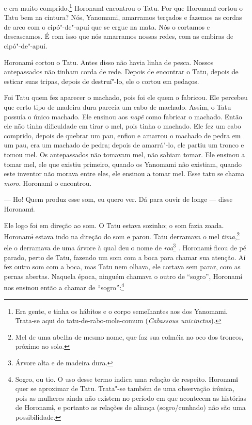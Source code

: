 
 

 

 e era muito comprido.\footnote{  Era gente, e tinha os hábitos e o corpo semelhantes aos dos Yanomami. Trata-se aqui do tatu-de-rabo-mole-comum (\emph{Cabassous unicinctus}).}  Horonamɨ
encontrou o Tatu. 
Por que Horonamɨ cortou o Tatu bem na cintura? Nós, Yanomami, amarramos
terçados e fazemos as cordas de arco com o cipó"-de"-apuí que se ergue na
mata. Nós o cortamos e descascamos. É com isso que nós amarramos nossas
redes, com as embiras de cipó"-de"-apuí. 

Horonamɨ cortou o Tatu. Antes disso não havia linha de pesca. Nossos
antepassados não tinham corda de rede. Depois de encontrar o Tatu,
depois de esticar suas tripas, depois de destruí"-lo, ele o cortou em
pedaços. 

Foi Tatu quem fez aparecer o machado, pois foi ele quem o fabricou. Ele
percebeu que certo tipo de madeira dura parecia um cabo de machado.
Assim, o Tatu possuía o único machado. Ele ensinou aos \emph{napë} como
fabricar o machado. Então ele não tinha dificuldade em tirar o mel, pois
tinha o machado. Ele fez um cabo comprido, depois de quebrar um pau,
enfiou e amarrou o machado de pedra em um pau, era um machado de pedra;
depois de amarrá"-lo, ele partiu um tronco e tomou mel. Os antepassados
não tomavam mel, não sabiam tomar. Ele ensinou a tomar mel, ele que
existiu primeiro, quando os Yanomami não existiam, quando este inventor
não morava entre eles, ele ensinou a tomar mel. Esse tatu se
chama \emph{moro}. Horonamɨ o encontrou. 


--- Ho! Quem produz esse som, eu quero ver. Dá para ouvir de longe --- disse
Horonamɨ. 

Ele logo foi em direção ao som. O Tatu estava sozinho; o som fazia
zoada. Horonamɨ estava indo na direção do som e parou. Tatu derramava o
mel \emph{tima},\footnote{  Mel de uma abelha de mesmo nome, que faz sua colméia no oco dos troncos, próximo ao solo.} ele o derramava de uma árvore à qual deu o nome
de \emph{roa}\footnote{  Árvore alta e de madeira dura.} \emph{.} Horonamɨ ficou de pé parado, perto de Tatu, fazendo um som com a boca para chamar sua atenção. Aí fez
outro som com a boca, mas Tatu nem olhava, ele cortava sem parar, com as
pernas abertas. Naquela época, ninguém chamava o outro de ``sogro'',
Horonamɨ nos ensinou então a chamar de ``sogro'':\footnote{  Sogro, ou tio. O uso desse termo indica uma relação de respeito. Horonamɨ quer se aproximar de Tatu. Trata"-se também de uma observação irônica, pois as mulheres ainda não existem no período em que acontecem as histórias de Horonamɨ, e portanto as relações de aliança (sogro/cunhado) não são uma possibilidade.}

